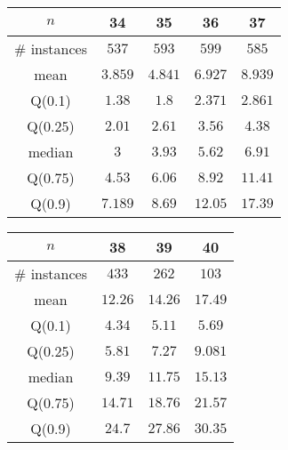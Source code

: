 \begin{tabular}{c|cccc} 
\hline 
$n$ & 34 & 35 & 36 & 37 \tabularnewline 
\hline 
\hline 
\# instances & $537$ & $593$ & $599$ & $585$ \tabularnewline 
mean & $3.859$ & $4.841$ & $6.927$ & $8.939$ \tabularnewline 
Q(0.1) & $1.38$ & $1.8$ & $2.371$ & $2.861$ \tabularnewline 
Q(0.25) & $2.01$ & $2.61$ & $3.56$ & $4.38$ \tabularnewline 
median & $3$ & $3.93$ & $5.62$ & $6.91$ \tabularnewline 
Q(0.75) & $4.53$ & $6.06$ & $8.92$ & $11.41$ \tabularnewline 
Q(0.9) & $7.189$ & $8.69$ & $12.05$ & $17.39$ \tabularnewline 
\hline 
\end{tabular} 
\medskip{} 

\begin{tabular}{c|ccc} 
\hline 
$n$ & 38 & 39 & 40 \tabularnewline 
\hline 
\hline 
\# instances & $433$ & $262$ & $103$ \tabularnewline 
mean & $12.26$ & $14.26$ & $17.49$ \tabularnewline 
Q(0.1) & $4.34$ & $5.11$ & $5.69$ \tabularnewline 
Q(0.25) & $5.81$ & $7.27$ & $9.081$ \tabularnewline 
median & $9.39$ & $11.75$ & $15.13$ \tabularnewline 
Q(0.75) & $14.71$ & $18.76$ & $21.57$ \tabularnewline 
Q(0.9) & $24.7$ & $27.86$ & $30.35$ \tabularnewline 
\hline 
\end{tabular} 
\medskip{} 

